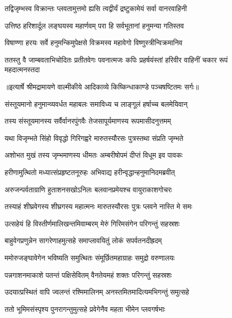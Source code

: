 \twolineshloka
{तद्विजृम्भस्व विक्रान्तः प्लवतामुत्तमो ह्यसि}
{त्वद्वीर्यं द्रष्टुकामेयं सर्वा वानरवाहिनी} %

\twolineshloka
{उत्तिष्ठ हरिशार्दूल लङ्घयस्व महार्णवम्}
{परा हि सर्वभूतानां हनुमन्या गतिस्तव} %

\twolineshloka
{विषाण्णा हरयः सर्वे हनुमन्किमुपेक्षसे}
{विक्रमस्व महावेगो विष्णुस्त्रीन्विक्रमानिव} %

\fourlineindentedshloka
{ततस्तु वै जाम्बवताभिचोदितः}
{ प्रतीतवेगः पवनात्मजः कपिः}
{प्रहर्षयंस्तां हरिवीर वाहिनीं}
{ चकार रूपं महदात्मनस्तदा} %


{॥इत्यार्षे श्रीमद्रामायणे वाल्मीकीये आदिकाव्ये किष्किन्धाकाण्डे पञ्चषष्टितमः सर्गः॥}


\twolineshloka
{संस्तूयमानो हनुमान्व्यवर्धत महाबलः}
{समाविध्य च लाङ्गूलं हर्षाच्च बलमेयिवान्} %

\twolineshloka
{तस्य संस्तूयमानस्य सर्वैर्वानरपुंगवैः}
{तेजसापूर्यमाणस्य रूपमासीदनुत्तमम्} %

\twolineshloka
{यथा विजृम्भते सिंहो विवृद्धो गिरिगह्वरे}
{मारुतस्यौरसः पुत्रस्तथा संप्रति जृम्भते} %

\twolineshloka
{अशोभत मुखं तस्य जृम्भमाणस्य धीमतः}
{अम्बरीषोपमं दीप्तं विधूम इव पावकः} %

\twolineshloka
{हरीणामुत्थितो मध्यात्संप्रहृष्टतनूरुहः}
{अभिवाद्य हरीन्वृद्धान्हनुमानिदमब्रवीत्} %

\twolineshloka
{अरुजन्पर्वताग्राणि हुताशनसखोऽनिलः}
{बलवानप्रमेयश्च वायुराकाशगोचरः} %

\twolineshloka
{तस्याहं शीघ्रवेगस्य शीघ्रगस्य महात्मनः}
{मारुतस्यौरसः पुत्रः प्लवने नास्ति मे समः} %

\twolineshloka
{उत्सहेयं हि विस्तीर्णमालिखन्तमिवाम्बरम्}
{मेरुं गिरिमसंगेन परिगन्तुं सहस्रशः} %

\twolineshloka
{बाहुवेगप्रणुन्नेन सागरेणाहमुत्सहे}
{समाप्लावयितुं लोकं सपर्वतनदीह्रदम्} %

\twolineshloka
{ममोरुजङ्घावेगेन भविष्यति समुत्थितः}
{संमूर्छितमहाग्राहः समुद्रो वरुणालयः} %

\twolineshloka
{पन्नगाशनमाकाशे पतन्तं पक्षिसेवितम्}
{वैनतेयमहं शक्तः परिगन्तुं सहस्रशः} %

\twolineshloka
{उदयात्प्रस्थितं वापि ज्वलन्तं रश्मिमालिनम्}
{अनस्तमितमादित्यमभिगन्तुं समुत्सहे} %

\twolineshloka
{ततो भूमिमसंस्पृश्य पुनरागन्तुमुत्सहे}
{प्रवेगेनैव महता भीमेन प्लवगर्षभाः} %

